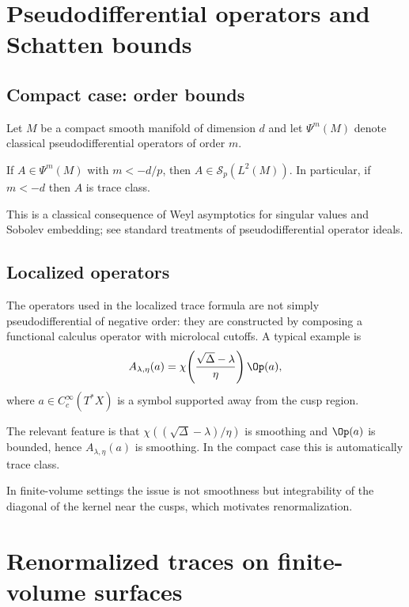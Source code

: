 \section{Pseudodifferential operators and Schatten bounds}
\label{sec:L.psiDO}

\subsection{Compact case: order bounds}
\label{subsec:L.compact.psiDO}

Let $M$ be a compact smooth manifold of dimension $d$ and let $\Psi^m(M)$ denote classical pseudodifferential
operators of order $m$.

\begin{theorem}
\label{thm:L.schatten.psiDO}
If $A\in \Psi^m(M)$ with $m<-d/p$, then $A\in \mathcal{S}_p(L^2(M))$.
In particular, if $m<-d$ then $A$ is trace class.
\end{theorem}

\begin{remark}
\label{rem:L.psiDO.references}
This is a classical consequence of Weyl asymptotics for singular values and Sobolev embedding; see standard
treatments of pseudodifferential operator ideals.
\end{remark}

\subsection{Localized operators}
\label{subsec:L.localized}

The operators used in the localized trace formula are not simply pseudodifferential of negative order: they are
constructed by composing a functional calculus operator with microlocal cutoffs.  A typical example is
\[
A_{\lambda,\eta}(a)
=
\chi\!\left(\frac{\sqrt{\Delta}-\lambda}{\eta}\right)\Op(a),
\]
where $a\in C_c^\infty(T^*X)$ is a symbol supported away from the cusp region.

The relevant feature is that $\chi((\sqrt{\Delta}-\lambda)/\eta)$ is smoothing and $\Op(a)$ is bounded, hence
$A_{\lambda,\eta}(a)$ is smoothing.  In the compact case this is automatically trace class.

In finite-volume settings the issue is not smoothness but integrability of the diagonal of the kernel near the cusps,
which motivates renormalization.

\section{Renormalized traces on finite-volume surfaces}
\label{sec:L.renormalized}

